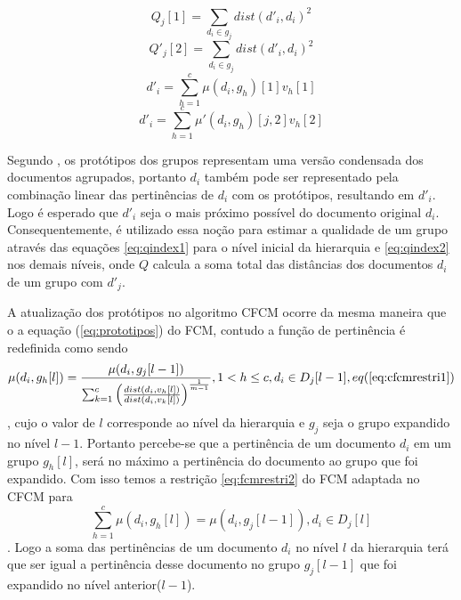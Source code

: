 \begin{equation}
  Q_j[1] = \sum_{d_i \in g_j} dist(d'_i,d_i)^2
  \label{eq:qindex1}
\end{equation}
\begin{equation}
  Q'_j[2] = \sum_{d_i \in g_j} dist(d'_i,d_i)^2
  \label{eq:qindex2}
\end{equation}
\begin{equation}
  d'_i = \sum_{h=1}^c \mu(d_i,g_h)[1]v_h[1] 
  \label{eq:dlinha1}
\end{equation}
\begin{equation}
  d'_i = \sum_{h=1}^c \mu'(d_i,g_h)[j,2]v_h[2] 
  \label{eq:dlinha2}
\end{equation}

Segundo \cite{Nogueira2013},
os protótipos dos grupos representam uma versão condensada dos documentos agrupados, portanto
$d_i$ também pode ser representado pela combinação linear das pertinências de $d_i$ com os
protótipos, resultando em $d'_i$. Logo é esperado que $d'_i$ seja o mais próximo possível do 
documento
original $d_i$. Consequentemente, é utilizado essa noção para estimar a qualidade de um grupo
através das equações \ref{eq:qindex1} para o nível inicial da hierarquia e \ref{eq:qindex2} nos
demais níveis, onde $Q$ calcula a soma total das distâncias dos documentos $d_i$ de um grupo com
$d'_j$.

A atualização dos protótipos no algoritmo CFCM ocorre da mesma maneira que o a equação
(\ref{eq:prototipos}) do FCM, contudo a função de pertinência é redefinida como sendo
\begin{equation}
  \mu(d_i,g_h[l]) = \frac{\mu(d_i,g_j[l-1])}
  {\sum_{k=1}^c \left(\frac{dist(d_i,v_h[l])}{dist(d_i,v_k[l])}\right)^{\frac{1}{m-1}}}, 
  1 < h \leq c,
  d_i \in D_j[l-1], eq (\ref{eq:cfcmrestri1})
  \label{eq:pertcfcm}
\end{equation}
, cujo o valor de $l$ corresponde ao nível da hierarquia e $g_j$ seja o grupo 
expandido no nível $l-1$.
Portanto percebe-se que a pertinência
de um documento $d_i$ em um grupo $g_h[l]$, será no máximo a pertinência do documento ao grupo que
foi expandido. Com isso temos a restrição \ref{eq:fcmrestri2} do FCM adaptada no CFCM para
\begin{equation}
  \sum_{h=1}^c \mu(d_i,g_h[l]) = \mu(d_i,g_j[l-1]), d_i \in D_j[l]
  \label{eq:cfcmrestri1}
\end{equation}
. Logo a soma das pertinências de um documento $d_i$ no nível $l$ da hierarquia terá que ser igual 
a pertinência desse documento no grupo $g_j[l-1]$ que foi expandido no nível anterior($l-1$).

